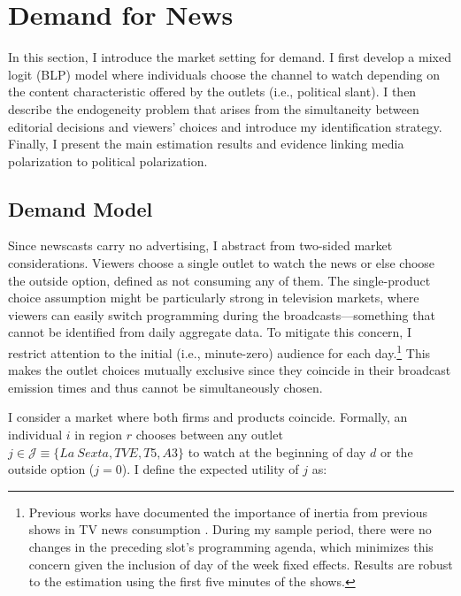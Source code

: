 \documentclass[12pt]{article}
\begin{document}
	
	
	
	
	
	
	
	

	
	
	\section{Demand for News}	\label{sec:demand}

In this section, I introduce the market setting for demand. I first develop a mixed logit (BLP) model \citep{berry_blp} where individuals choose the channel to watch depending on the content characteristic offered by the outlets (i.e., political slant). I then describe the endogeneity problem that arises from the simultaneity between editorial decisions and viewers' choices and introduce my identification strategy. Finally, I present the main estimation results and evidence linking media polarization to political polarization. 

	\subsection{Demand Model}



Since newscasts carry no advertising, I abstract from two-sided market considerations. Viewers choose a single outlet to watch the news or else choose the outside option, defined as not consuming any of them. The single-product choice assumption might be particularly strong in television markets, where viewers can easily switch programming during the broadcasts—something that cannot be identified from daily aggregate data. To mitigate this concern, I restrict attention to the initial (i.e., minute-zero) audience for each day.\footnote{Previous works have documented the importance of inertia from previous shows in TV news consumption \citep{richter2025structural}. During my sample period, there were no changes in the preceding slot's programming agenda, which minimizes this concern given the inclusion of day of the week fixed effects. Results are robust to the estimation using the first five minutes of the shows. } This makes the outlet choices mutually exclusive since they coincide in their broadcast emission times and thus cannot be simultaneously chosen. 



	I consider a market where both firms and products coincide. Formally, an individual $ i $  in region $r$ chooses between any outlet $ j \in \mathcal{J}\equiv \{La \ Sexta,TVE,T5,A3\}$  to watch at the beginning of day $d$ or the outside option ($j=0$). I define the expected utility of  $j$ as:
	
\end{document}
